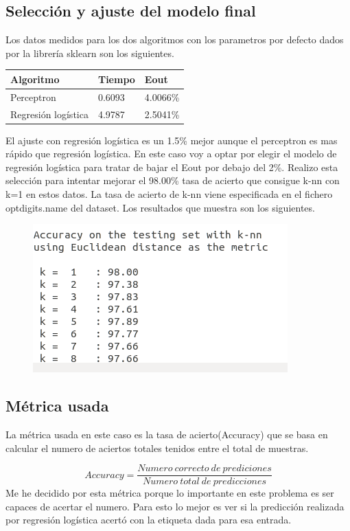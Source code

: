 \documentclass[titlepage]{article}
\begin{document}
\subsection{Selección y ajuste del modelo final}
Los datos medidos para los dos algoritmos con los parametros por defecto dados por la librería sklearn son los siguientes.
	\begin{table}[H]
		\begin{center}
			\begin{tabular}{|l|l|l|}
				\hline
				Algoritmo & Tiempo & Eout\\
				\hline
				Perceptron & 0.6093 & 4.0066\%\\ 
				\hline
				Regresión logística & 4.9787 & 2.5041\%\\  
				\hline
			\end{tabular}
		\end{center}
	\end{table}
El ajuste con regresión logística es un 1.5\% mejor aunque el perceptron es mas rápido que regresión logística. En este caso voy a optar por elegir el modelo de regresión logística para tratar de bajar el Eout por debajo del 2\%. Realizo esta selección para intentar mejorar el 98.00\% tasa de acierto que consigue k-nn con k=1 en estos datos. La tasa de acierto de k-nn viene especificada en el fichero optdigits.name del dataset. Los resultados que muestra son los siguientes.
\begin{figure}[H]
	\centering
	\includegraphics[width=0.7\linewidth]{screenshot006}
\end{figure}
 
\subsection{Métrica usada}
La métrica usada en este caso es la tasa de acierto(Accuracy) que se basa en calcular el numero de aciertos totales tenidos entre el total de muestras. 


$$
Accuracy=\frac{Numero\ correcto\ de\ prediciones}{Numero\ total\ de\ predicciones}
$$
Me he decidido por esta métrica porque lo importante en este problema es ser capaces de acertar el numero. Para esto lo mejor es ver si la predicción realizada por regresión logística acertó con la etiqueta dada para esa entrada.
\end{document}
